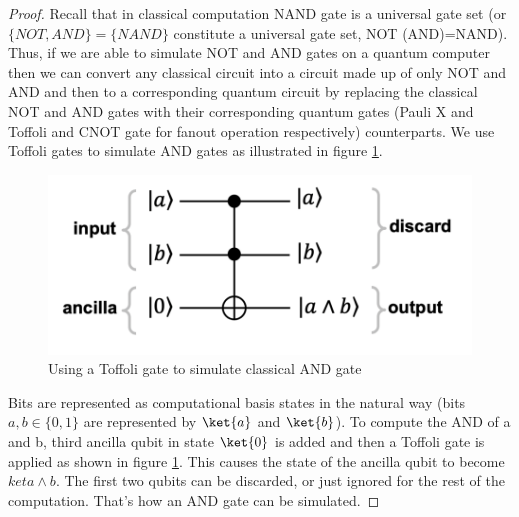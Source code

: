 \documentclass[12pt, oneside]{book}
\theoremstyle{definition}
\theoremstyle{definition}
\theoremstyle{remark}
\begin{document}
\begin{proof}
Recall that in classical computation NAND gate is a universal gate set (or $\{NOT, AND\}=\{NAND\}$ constitute a universal gate set, NOT (AND)=NAND). Thus, if we are able to simulate NOT and AND gates on a quantum computer then we can convert any classical circuit into a circuit made up of only NOT and AND and then to a corresponding quantum circuit by replacing the classical NOT and AND gates with their corresponding quantum gates (Pauli X and Toffoli and CNOT gate for fanout operation respectively) counterparts.
    We use Toffoli gates to simulate AND gates as illustrated in figure \ref{fig:toffoli_classical}.
    \begin{figure}[H]
        \centering
        \includegraphics[width=0.5\linewidth]{../images/toffoli_classical.png}
        \caption{Using a Toffoli gate to simulate classical AND gate}
        \label{fig:toffoli_classical}
    \end{figure}
    Bits are represented as computational basis states in the natural way (bits $a,b \in \{0,1\}$ are represented by $\ket{a}$ and $\ket{b}$). To compute the AND of a and b, third ancilla qubit in state $\ket{0}$ is added and then a Toffoli gate is applied as shown in figure \ref{fig:toffoli_classical}. This causes the state of the ancilla qubit to become $ket{a \land b}$. The first two qubits can be discarded, or just ignored for the rest of the computation. That's how an AND gate can be simulated.


\end{proof}
\end{document}
